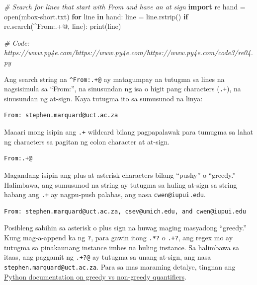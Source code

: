 \documentclass[10pt,]{book}
\newenvironment{Shaded}{}{}
\newcommand{\BuiltInTok}[1]{\textcolor[rgb]{0.00,0.50,0.00}{#1}}
\newcommand{\CommentTok}[1]{\textcolor[rgb]{0.38,0.63,0.69}{\textit{#1}}}
\newcommand{\ControlFlowTok}[1]{\textcolor[rgb]{0.00,0.44,0.13}{\textbf{#1}}}
\newcommand{\ImportTok}[1]{\textcolor[rgb]{0.00,0.50,0.00}{\textbf{#1}}}
\newcommand{\KeywordTok}[1]{\textcolor[rgb]{0.00,0.44,0.13}{\textbf{#1}}}
\newcommand{\NormalTok}[1]{#1}
\newcommand{\OperatorTok}[1]{\textcolor[rgb]{0.40,0.40,0.40}{#1}}
\newcommand{\StringTok}[1]{\textcolor[rgb]{0.25,0.44,0.63}{#1}}
\begin{document}
\begin{Shaded}
\begin{Highlighting}[]
\CommentTok{\# Search for lines that start with From and have an at sign}
\ImportTok{import}\NormalTok{ re}
\NormalTok{hand }\OperatorTok{=} \BuiltInTok{open}\NormalTok{(}\StringTok{\textquotesingle{}mbox{-}short.txt\textquotesingle{}}\NormalTok{)}
\ControlFlowTok{for}\NormalTok{ line }\KeywordTok{in}\NormalTok{ hand:}
\NormalTok{    line }\OperatorTok{=}\NormalTok{ line.rstrip()}
    \ControlFlowTok{if}\NormalTok{ re.search(}\StringTok{\textquotesingle{}\^{}From:.+@\textquotesingle{}}\NormalTok{, line):}
        \BuiltInTok{print}\NormalTok{(line)}

\CommentTok{\# Code: https://www.py4e.com/https://www.py4e.com/https://www.py4e.com/code3/re04.py}
\end{Highlighting}
\end{Shaded}


Ang search string na \texttt{\^{}From:.+@} ay matagumpay na tutugma sa
lines na nagsisimula sa ``From:'', na sinusundan ng isa o higit pang
characters (\texttt{.+}), na sinusundan ng at-sign. Kaya tutugma ito sa
sumusunod na linya:

{\small
\begin{verbatim}
From: stephen.marquard@uct.ac.za
\end{verbatim}
}

Maaari mong isipin ang \texttt{.+} wildcard bilang pagpapalawak para
tumugma sa lahat ng characters sa pagitan ng colon character at at-sign.

{\small
\begin{verbatim}
From:.+@
\end{verbatim}
}

Magandang isipin ang plus at asterisk characters bilang ``pushy'' o
``greedy.'' Halimbawa, ang sumusunod na string ay tutugma sa huling
at-sign sa string habang ang \texttt{.+} ay nagpu-push palabas, ang nasa
\texttt{cwen@iupui.edu}.

{\small
\begin{verbatim}
From: stephen.marquard@uct.ac.za, csev@umich.edu, and cwen@iupui.edu
\end{verbatim}
}

Posibleng sabihin sa asterisk o plus sign na huwag maging masyadong
``greedy.'' Kung mag-a-append ka ng \texttt{?}, para gawin itong
\texttt{.*?} o \texttt{.+?}, ang regex mo ay tutugma sa pinakaunang
instance imbes na huling instance. Sa halimbawa sa itaas, ang paggamit
ng \texttt{.+?@} ay tutugma sa unang at-sign, ang nasa
\texttt{stephen.marquard@uct.ac.za}. Para sa mas maraming detalye,
tingnan ang \href{https://docs.python.org/3/library/re.html}{Python
documentation on greedy vs non-greedy quantifiers}.
\end{document}
